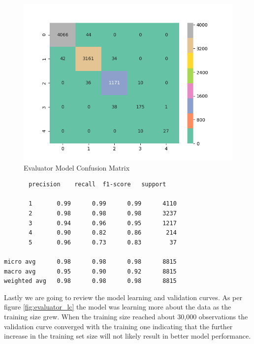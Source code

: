 \begin{Schunk}
\begin{figure}[H]

{\centering \includegraphics[width=1\linewidth]{../../models/training/evaluator_rf_tuned_large_matrix} 

}

\caption[Evaluator Model Confusion Matrix]{Evaluator Model Confusion Matrix}\label{fig:evaluator_cm}
\end{figure}
\end{Schunk}

\begin{verbatim}
       precision    recall  f1-score   support

       1       0.99      0.99      0.99      4110
       2       0.98      0.98      0.98      3237
       3       0.94      0.96      0.95      1217
       4       0.90      0.82      0.86       214
       5       0.96      0.73      0.83        37

micro avg      0.98      0.98      0.98      8815
macro avg      0.95      0.90      0.92      8815
weighted avg   0.98      0.98      0.98      8815
\end{verbatim}

Lastly we are going to review the model learning and validation curves.
As per figure \ref{fig:evaluator_lc} the model was learning more about
the data as the training size grew. When the training size reached about
30,000 observations the validation curve converged with the training one
indicating that the further increase in the training set size will not
likely result in better model performance.

